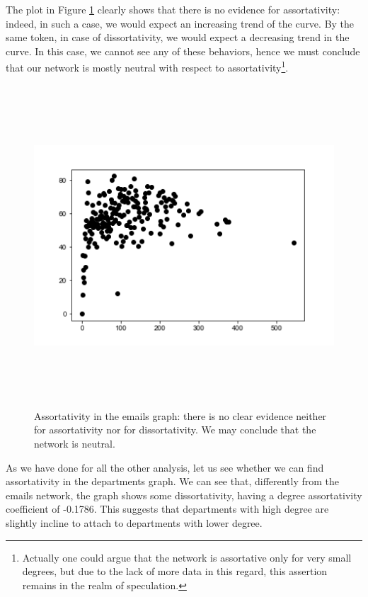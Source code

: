 \documentclass{report}
\theoremstyle{definition}
\theoremstyle{remark}
\begin{document}
The plot in Figure \ref{fig:AssortMail} clearly shows that there is no evidence for assortativity: indeed, in such a case, we would expect an increasing trend of the curve. By the same token, in case of dissortativity, we would expect a decreasing trend in the curve. In this case, we cannot see any of these behaviors, hence we must conclude that our network is mostly neutral with respect to assortativity\footnote{Actually one could argue that the network is assortative only for very small degrees, but due to the lack of more data in this regard, this assertion remains in the realm of speculation.}.
\begin{figure} [H]
	\centering
	\centerline{\includegraphics[width = 13cm, height = 12cm, keepaspectratio]{assortativity.png}}
	\caption{Assortativity in the emails graph: there is no clear evidence neither for assortativity nor for dissortativity. We may conclude that the network is neutral.} \label{fig:AssortMail}
\end{figure}
As we have done for all the other analysis, let us see whether we can find assortativity in the departments graph. We can see that, differently from the emails network, the graph shows some dissortativity, having a degree assortativity coefficient of -0.1786. This suggests that departments with high degree are slightly incline to attach to departments with lower degree.
\end{document}
